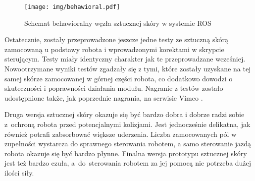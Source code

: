 \begin{figure}[!h]
    \centering 
    \texttt{[image: img/behawioral.pdf]}
    \caption{Schemat behawioralny węzła sztucznej skóry w systemie ROS}
    \label{f_behaw}
\end{figure}

Ostatecznie, zostały przeprowadzone jeszcze jedne testy ze sztuczną skórą zamocowaną u podstawy robota i wprowadzonymi korektami w skrypcie sterującym. Testy miały identyczny charakter jak te przeprowadzane wcześniej. Nowootrzymane wyniki testów zgadzały się z tymi, które zostały uzyskane na tej samej skórze zamocowanej w górnej części robota, co dodatkowo dowodzi o skuteczności i poprawności działania modułu. Nagranie z testów zostało udostępnione także, jak poprzednie nagrania, na serwisie Vimeo \cite{b_site_vimeo_okrag}.

Druga wersja sztucznej skóry okazuje się być bardzo dobra i dobrze radzi sobie z~ochroną robota przed potencjalnymi kolizjami. Jest jednocześnie delikatna, jak również potrafi zabsorbować większe uderzenia. Liczba zamocowanych pól w zupełności wystarcza do sprawnego sterowania robotem, a samo sterowanie jazdą robota okazuje się być bardzo płynne. Finalna wersja prototypu sztucznej skóry jest też bardzo czuła, a~do~sterowania robotem za jej pomocą nie potrzeba dużej ilości siły.
